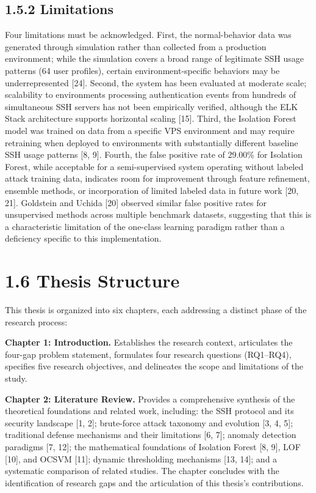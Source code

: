 \documentclass[
  a4paper]{report}
\begin{document}
\subsection{1.5.2 Limitations}\label{limitations}

Four limitations must be acknowledged. First, the normal-behavior data
was generated through simulation rather than collected from a production
environment; while the simulation covers a broad range of legitimate SSH
usage patterns (64 user profiles), certain environment-specific
behaviors may be underrepresented {[}24{]}. Second, the system has been
evaluated at moderate scale; scalability to environments processing
authentication events from hundreds of simultaneous SSH servers has not
been empirically verified, although the ELK Stack architecture supports
horizontal scaling {[}15{]}. Third, the Isolation Forest model was
trained on data from a specific VPS environment and may require
retraining when deployed to environments with substantially different
baseline SSH usage patterns {[}8, 9{]}. Fourth, the false positive rate
of 29.00\% for Isolation Forest, while acceptable for a semi-supervised
system operating without labeled attack training data, indicates room
for improvement through feature refinement, ensemble methods, or
incorporation of limited labeled data in future work {[}20, 21{]}.
Goldstein and Uchida {[}20{]} observed similar false positive rates for
unsupervised methods across multiple benchmark datasets, suggesting that
this is a characteristic limitation of the one-class learning paradigm
rather than a deficiency specific to this implementation.

\section{1.6 Thesis Structure}\label{thesis-structure}

This thesis is organized into six chapters, each addressing a distinct
phase of the research process:

\textbf{Chapter 1: Introduction.} Establishes the research context,
articulates the four-gap problem statement, formulates four research
questions (RQ1--RQ4), specifies five research objectives, and delineates
the scope and limitations of the study.

\textbf{Chapter 2: Literature Review.} Provides a comprehensive
synthesis of the theoretical foundations and related work, including:
the SSH protocol and its security landscape {[}1, 2{]}; brute-force
attack taxonomy and evolution {[}3, 4, 5{]}; traditional defense
mechanisms and their limitations {[}6, 7{]}; anomaly detection paradigms
{[}7, 12{]}; the mathematical foundations of Isolation Forest {[}8,
9{]}, LOF {[}10{]}, and OCSVM {[}11{]}; dynamic thresholding mechanisms
{[}13, 14{]}; and a systematic comparison of related studies. The
chapter concludes with the identification of research gaps and the
articulation of this thesis's contributions.
\end{document}
